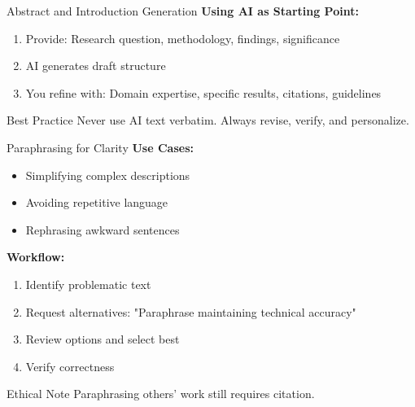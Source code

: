 \documentclass[aspectratio=169]{beamer}
\begin{document}
	\begin{frame}{Abstract and Introduction Generation}
		\textbf{Using AI as Starting Point:}
		
		\begin{enumerate}
			\item Provide: Research question, methodology, findings, significance
			\item AI generates draft structure
			\item You refine with: Domain expertise, specific results, citations, guidelines
		\end{enumerate}
		
		\vspace{0.5em}
		
		\begin{alertblock}{Best Practice}
			Never use AI text verbatim. Always revise, verify, and personalize.
		\end{alertblock}
	\end{frame}
	
	\begin{frame}{Paraphrasing for Clarity}
		\textbf{Use Cases:}
		\begin{itemize}
			\item Simplifying complex descriptions
			\item Avoiding repetitive language
			\item Rephrasing awkward sentences
		\end{itemize}
		
		\vspace{0.5em}
		
		\textbf{Workflow:}
		\begin{enumerate}
			\item Identify problematic text
			\item Request alternatives: "Paraphrase maintaining technical accuracy"
			\item Review options and select best
			\item Verify correctness
		\end{enumerate}
		
		\vspace{0.3em}
		
		\begin{block}{Ethical Note}
			Paraphrasing others' work still requires citation.
		\end{block}
	\end{frame}
	
\end{document}
